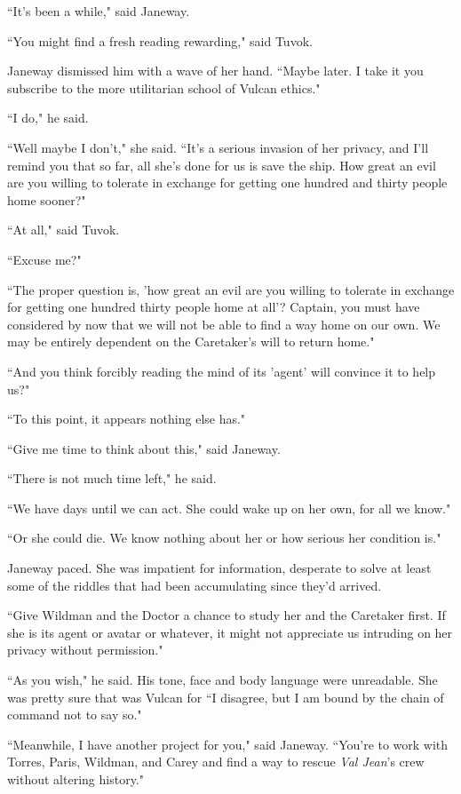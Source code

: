\documentclass[twoside,letterpaper,12pt]{memoir}
\begin{document}
``It's been a while," said Janeway. 

``You might find a fresh reading rewarding," said Tuvok. 

Janeway dismissed him with a wave of her hand. ``Maybe later. I take it you subscribe to the more utilitarian school of Vulcan ethics." 

``I do," he said. 

``Well maybe I don't," she said. ``It's a serious invasion of her privacy, and I'll remind you that so far, all she's done for us is save the ship. How great an evil are you willing to tolerate in exchange for getting one hundred and thirty people home sooner?" 

``At all," said Tuvok. 

``Excuse me?" 

``The proper question is, 'how great an evil are you willing to tolerate in exchange for getting one hundred thirty people home at all'? Captain, you must have considered by now that we will not be able to find a way home on our own. We may be entirely dependent on the Caretaker's will to return home." 

``And you think forcibly reading the mind of its 'agent' will convince it to help us?" 

``To this point, it appears nothing else has." 

``Give me time to think about this," said Janeway. 

``There is not much time left," he said. 

``We have days until we can act. She could wake up on her own, for all we know." 

``Or she could die. We know nothing about her or how serious her condition is." 

Janeway paced. She was impatient for information, desperate to solve at least some of the riddles that had been accumulating since they'd arrived. 

``Give Wildman and the Doctor a chance to study her and the Caretaker first. If she is its agent or avatar or whatever, it might not appreciate us intruding on her privacy without permission." 

``As you wish," he said. His tone, face and body language were unreadable. She was pretty sure that was Vulcan for ``I disagree, but I am bound by the chain of command not to say so." 

``Meanwhile, I have another project for you," said Janeway. ``You're to work with Torres, Paris, Wildman, and Carey and find a way to rescue \textit{Val Jean}'s crew without altering history." 
\end{document}

